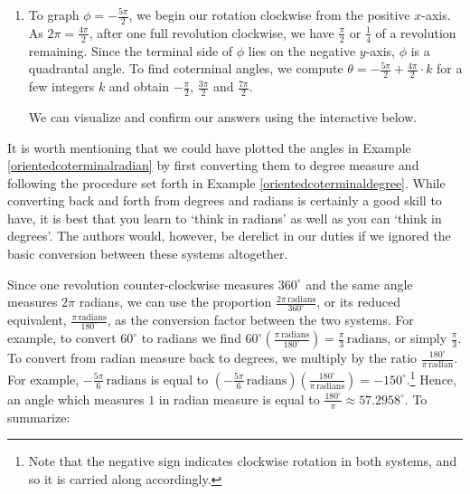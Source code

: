 \documentclass{ximera}
\begin{document}
\begin{example}
\begin{explanation}
\begin{enumerate}
We can confirm our answers using the GeoGebra interactive below.

\begin{center}
\end{center}

\item  To graph  $\phi = -\frac{5 \pi}{2}$, we begin our rotation clockwise from the positive $x$-axis.  As  $2 \pi = \frac{4 \pi}{2}$, after one full revolution clockwise, we have  $\frac{\pi}{2}$ or $\frac{1}{4}$ of a revolution remaining.  Since the terminal side of $\phi$ lies on the negative $y$-axis, $\phi$ is a quadrantal angle.  To find coterminal angles, we compute $\theta = -\frac{5 \pi}{2} +   \frac{4 \pi}{2} \cdot k$ for a few integers $k$ and obtain $-\frac{\pi}{2}$, $\frac{3 \pi}{2}$ and $\frac{7 \pi}{2}$.

We can visualize and confirm our answers using the interactive below.

\begin{center}
\end{center}

\end{enumerate}

\end{explanation}

\end{example}

It is worth mentioning that we could have plotted the angles in Example \ref{orientedcoterminalradian} by first converting them to degree measure and following the procedure set forth in Example \ref{orientedcoterminaldegree}.  While converting back and forth from degrees and radians is certainly a good skill to have, it is best that you learn to `think in radians' as well as you can `think in degrees'.  The authors would, however, be derelict in our duties if we ignored the basic conversion between these systems altogether.  

Since one revolution counter-clockwise measures $360^{\circ}$ and the same angle measures $2 \pi$ radians, we can use the proportion $\frac{2 \pi \, \text{radians}}{360^{\circ}}$, or its reduced equivalent, $\frac{\pi \, \text{radians}}{180^{\circ}}$, as the conversion factor between the two systems.  For example, to convert $60^{\circ}$ to radians we find $60^{\circ} \left( \frac{\pi \, \text{radians}}{180^{\circ}}\right) = \frac{\pi}{3} \, \text{radians}$, or simply $\frac{\pi}{3}$.  To convert from radian measure back to degrees, we multiply by the ratio $\frac{180^{\circ}}{\pi \, \text{radian}}$.  For example,  $-\frac{5 \pi}{6} \, \text{radians}$ is equal to $\left(-\frac{5 \pi}{6} \, \text{radians} \right) \left( \frac{180^{\circ}}{\pi \, \text{radians}}\right) = -150^{\circ}$.\footnote{Note that the negative sign indicates clockwise rotation in both systems, and so it is carried along accordingly.}  Hence,  an angle which measures $1$ in radian measure is equal to $\frac{180^{\circ}}{\pi}  \approx 57.2958^{\circ}$.   To summarize:
\end{document}
